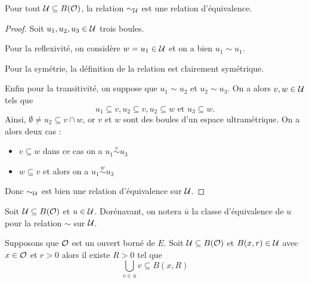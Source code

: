 \documentclass[../../rapport.tex]{subfiles}
\begin{document}
  \begin{proposition}
    Pour tout $\mathcal U \subseteq B(\mathcal{O})$, la relation $\sim_{\mathcal U}$ est une relation d'équivalence.
  \end{proposition}

  \begin{proof}
    Soit $u_1, u_2, u_3 \in \mathcal U$ trois boules.

    Pour la reflexivité, on considère $w = u_1 \in \mathcal U$ et on a bien $u_1 \sim u_1$.

    Pour la symétrie, la définition de la relation est clairement symétrique.

    Enfin pour la transitivité, on suppose que $u_1 \sim u_2$ et $u_2 \sim u_3$.
    On a alors $v, w \in \mathcal U$ tels que
    $$u_1 \subseteq v, u_2 \subseteq v, u_2 \subseteq w \text{ et } u_3 \subseteq w.$$
    Ainsi, $\emptyset \not= u_2 \subseteq v \cap w$, or $v$ et $w$ sont des boules d'un espace ultramétrique. On a alors deux cas :
    \begin{itemize}
      \item $v \subseteq w$ dans ce cas on a $u_1 \stackrel{v}{\sim} u_3$
      \item $w \subseteq v$ et alors on a $u_1 \stackrel{w}{\sim} u_3$
    \end{itemize}
    \begin{figure}[h]
      \centering
	\hspace{1.5cm}

  \end{figure}
  Donc $\sim_{\mathcal U}$ est bien une relation d'équivalence sur $\mathcal U$.
  \end{proof}

  Soit $\mathcal U \subseteq B(\mathcal{O})$ et $u \in \mathcal U$.
  Dorénavant, on notera $\bar{u}$ la classe d'équivalence de $u$ pour la relation $\sim$ sur $\mathcal U$.

  \begin{proposition}
    Supposons que $\mathcal{O}$ est un ouvert borné de $E$.
    Soit $\mathcal U \subseteq B(\mathcal{O})$ et $B(x, r) \in \mathcal U$ avec $x \in \mathcal{O}$ et $r>0$ alors il existe $R > 0$ tel que
    $$\bigcup_{v \in \bar{u}}{v} \subseteq B(x, R) $$
  \end{proposition}
\end{document}
